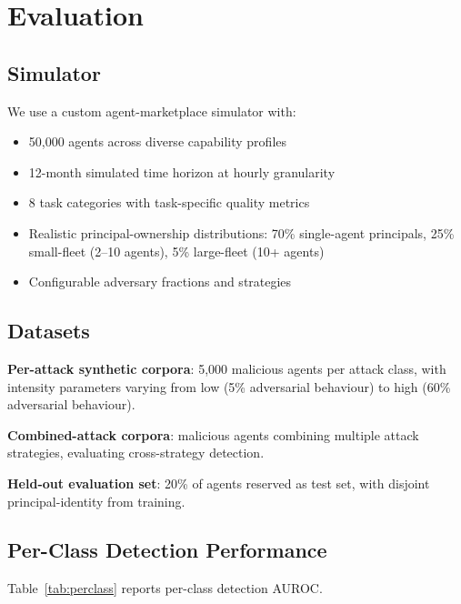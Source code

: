 \documentclass[sigconf,nonacm]{acmart}
\begin{document}
\section{Evaluation}

\subsection{Simulator}

We use a custom agent-marketplace simulator with:

\begin{itemize}
  \item 50{,}000 agents across diverse capability profiles
  \item 12-month simulated time horizon at hourly granularity
  \item 8 task categories with task-specific quality metrics
  \item Realistic principal-ownership distributions: 70\%
        single-agent principals, 25\% small-fleet (2--10 agents),
        5\% large-fleet (10+ agents)
  \item Configurable adversary fractions and strategies
\end{itemize}

\subsection{Datasets}

\textbf{Per-attack synthetic corpora}: 5{,}000 malicious agents per
attack class, with intensity parameters varying from low (5\%
adversarial behaviour) to high (60\% adversarial behaviour).

\textbf{Combined-attack corpora}: malicious agents combining
multiple attack strategies, evaluating cross-strategy detection.

\textbf{Held-out evaluation set}: 20\% of agents reserved as
test set, with disjoint principal-identity from training.

\subsection{Per-Class Detection Performance}

Table~\ref{tab:perclass} reports per-class detection AUROC.
\end{document}

